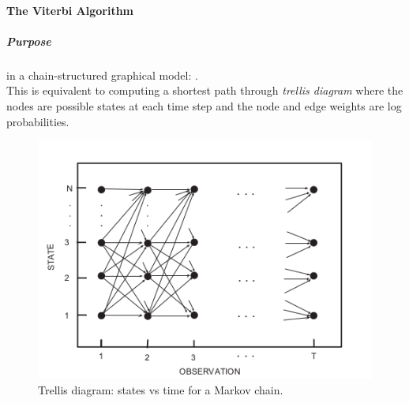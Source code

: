 \paragraph{The Viterbi Algorithm}
\subparagraph{Purpose}
 in a chain-structured graphical model: .\\
This is equivalent to computing a shortest path through \textit{trellis diagram} where the nodes are 
possible states at each time step and the node and edge weights are log probabilities.
\begin{figure}[H]
    \begin{center}
        \includegraphics[width=.5\textwidth]{chapters/2_statistics/07_hidden_markov_models/2_images/2_trellis_diagram.png}
    \end{center}
    \caption{Trellis diagram: states vs time for a Markov chain.}
    \label{fig:2_trellis_diagram}
\end{figure}
